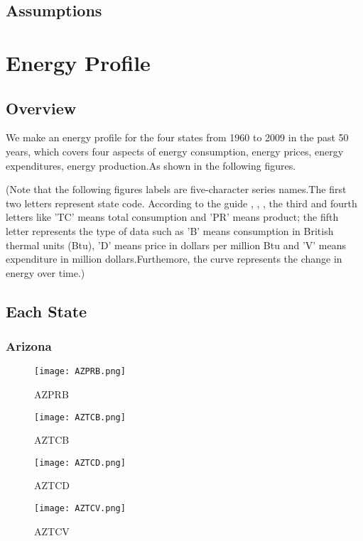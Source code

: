 \documentclass{mcmthesis}
\begin{document}
\subsection{Assumptions}

\section{Energy Profile}
\subsection{Overview}
We make an energy profile for the four states from 1960 to 2009 in the past 50 years, which covers four aspects of energy consumption, energy prices, energy expenditures, energy production.As shown in the following figures.

(Note that the following figures labels are five-character series names.The first two letters  represent state code. According to the guide \cite{pr_guide}, \cite{use_guide}, \cite{product}, the third and fourth letters like 'TC' means total consumption and 'PR' means product; the fifth letter represents the type of data such as 'B' means consumption in British thermal units (Btu), 'D' means price in dollars per million Btu and 'V' means expenditure in million dollars.Furthemore, the curve represents the change in energy over time.) 

\subsection{Each State}
\subsubsection{Arizona}
\begin{figure}[H]
\begin{minipage}[htb]{0.5\textwidth}
\centering
\texttt{[image: AZPRB.png]}
\caption{AZPRB} \label{fig:AZPRB}
\end{minipage}
\begin{minipage}[htb]{0.5\textwidth}
\centering
\texttt{[image: AZTCB.png]}
\caption{AZTCB} \label{fig:AZTCB}
\end{minipage}
\end{figure}

\begin{figure}[H]
\begin{minipage}[htb]{0.5\textwidth}
\centering
\texttt{[image: AZTCD.png]}
\caption{AZTCD} \label{fig:AZTCD}
\end{minipage}
\begin{minipage}[htb]{0.5\textwidth}
\centering
\texttt{[image: AZTCV.png]}
\caption{AZTCV} \label{fig:AZTCV}
\end{minipage}
\end{figure}
\end{document}
